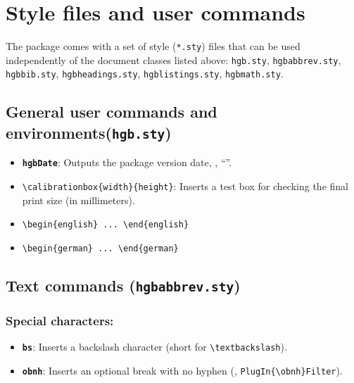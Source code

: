 \documentclass[english]{hgbarticle}
\begin{document}
\section{Style files and user commands}

The package comes with a set of style (\texttt{*.sty}) files that can be used
independently of the document classes listed above:
\texttt{hgb.sty},
\texttt{hgbabbrev.sty},
\texttt{hgbbib.sty},
\texttt{hgbheadings.sty},
\texttt{hgblistings.sty},
\texttt{hgbmath.sty}.


\subsection{General user commands and environments(\texttt{hgb.sty})}


\begin{itemize}
\item \textbf{\texttt{{\bs}hgbDate}}: Outputs the package version date, 
		\eg, ``\texttt{\hgbDate}''.
\item \verb!\calibrationbox{width}{height}!: Inserts a test box for checking the final print size 
(in millimeters).
\item \verb!\begin{english} ... \end{english}!
\item \verb!\begin{german} ... \end{german}!
\end{itemize}



\subsection{Text commands (\texttt{hgbabbrev.sty})}

\subsubsection*{Special characters:}

\begin{itemize}
\item \textbf{\texttt{{\bs}bs}}: Inserts a backslash character (short for \verb!\textbackslash!).
\item \textbf{\texttt{{\bs}obnh}}: Inserts an optional break with no hyphen (\eg, \verb!PlugIn{\obnh}Filter!).
\end{itemize}
\end{document}
